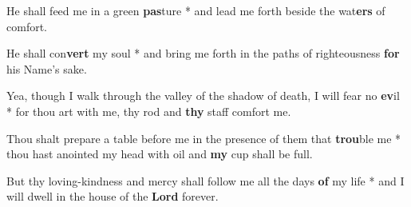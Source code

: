 \begin{multicols}{2}
	He shall feed me in a green \textbf{pas}ture * and lead me forth beside the wat\textbf{ers} of comfort.
	
	He shall con\textbf{vert} my soul * and bring me forth in the paths of righteousness \textbf{for} his Name's sake.
	
	Yea, though I walk through the valley of the shadow of death, I will fear no \textbf{ev}il * for thou art with me, thy rod and \textbf{thy} staff comfort me.
	
	Thou shalt prepare a table before me in the presence of them that \textbf{trou}ble me * thou hast anointed my head with oil and \textbf{my} cup shall be full.
	
	But thy loving-kindness and mercy shall follow me all the days \textbf{of} my life * and I will dwell in the house of the \textbf{Lord} forever.
\end{multicols}